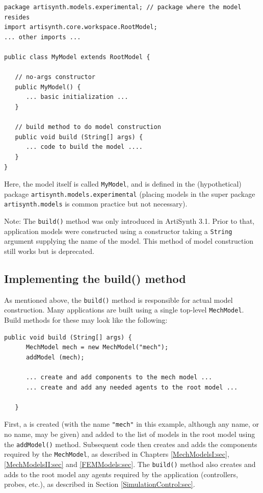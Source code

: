 \begin{lstlisting}[]
package artisynth.models.experimental; // package where the model resides
import artisynth.core.workspace.RootModel;
... other imports ...

public class MyModel extends RootModel {

   // no-args constructor
   public MyModel() {
      ... basic initialization ...
   }

   // build method to do model construction
   public void build (String[] args) {
      ... code to build the model ....
   }
}
\end{lstlisting}
Here, the model itself is called {\tt MyModel}, and is defined in the
(hypothetical) 
package {\tt artisynth.models.experimental} (placing models in the super
package {\tt artisynth.models} is common practice but not
necessary).

\begin{sideblock}
Note: The {\tt build()} method was only introduced in ArtiSynth
3.1. Prior to that, application models were constructed using a
constructor taking a {\tt String} argument supplying the name of the
model. This method of model construction still works but is
deprecated.
\end{sideblock}

\subsection{Implementing the build() method}
\label{ImplementingBuild:sec}

As mentioned above, the {\tt build()} method is responsible for actual
model construction.  Many applications are built using a single
top-level {\tt MechModel}.  Build methods for these may look
like the following:
\begin{lstlisting}[]
   public void build (String[] args) {
      MechModel mech = new MechModel("mech");
      addModel (mech);

      ... create and add components to the mech model ...
      ... create and add any needed agents to the root model ...

   }
\end{lstlisting}
First, a  is created
(with the name {\tt "mech"} in this example, although any name, or no
name, may be given) and added to the list of models in the root model
using the {\tt addModel()} method. Subsequent code then creates and
adds the components required by the {\tt MechModel}, as described in
Chapters \ref{MechModelsI:sec}, \ref{MechModelsII:sec} and
\ref{FEMModels:sec}.  The {\tt build()} method also creates and adds
to the root model any agents required by the application (controllers,
probes, etc.), as described in Section \ref{SimulationControl:sec}.

